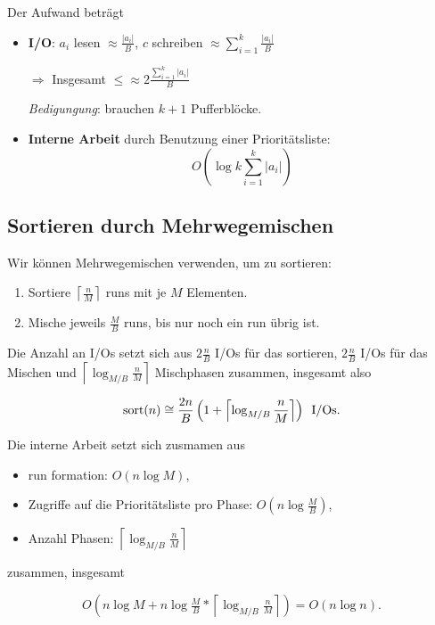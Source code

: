 Der Aufwand beträgt

\begin{itemize}
  \item \textbf{I/O}: \( a_i \) lesen \( \approx \frac{\left\vert a_i \right\vert}{B} \), \( c \) schreiben \( \approx \sum_{i=1}^k \frac{\left\vert a_i \right\vert}{B} \)

  \( \Rightarrow \) Insgesamt \( \leq \approx 2\frac{\sum_{i=1}^k \left\vert a_i \right\vert}{B} \)

  \emph{Bedigungung}: brauchen \( k+1 \) Pufferblöcke.

  \item \textbf{Interne Arbeit} durch Benutzung einer Prioritätsliste:
  \begin{equation*}
    O\left( \log k \sum_{i=1}^k \left\vert a_i \right\vert \right)
  \end{equation*}
\end{itemize}

\subsection{Sortieren durch Mehrwegemischen}

Wir können Mehrwegemischen verwenden, um zu sortieren:

\begin{enumerate}
  \item Sortiere \( \left\lceil \tfrac{n}{M} \right\rceil \) runs mit je \( M \) Elementen.
  \item Mische jeweils \( \tfrac{M}{B} \) runs, bis nur noch ein run übrig ist.
\end{enumerate}

Die Anzahl an I/Os setzt sich aus \( 2\tfrac{n}{B} \) I/Os für das sortieren, \( 2\tfrac{n}{B} \) I/Os für das Mischen und \( \left\lceil \log_{M/B} \tfrac{n}{M} \right\rceil \) Mischphasen zusammen, insgesamt also

\begin{equation*}
  \text{sort}(n) \cong \frac{2n}{B}\left( 1 + \left\lceil \log_{M/B} \frac{n}{M} \right\rceil \right) \enskip \text{I/Os.}
\end{equation*}

Die interne Arbeit setzt sich zusmamen aus
\begin{itemize}
  \item run formation: \( O(n\log M) \),
  \item Zugriffe auf die Prioritätsliste pro Phase: \( O\left( n\log \tfrac{M}{B} \right) \),
  \item Anzahl Phasen: \( \left\lceil \log_{M/B} \tfrac{n}{M} \right\rceil \)
\end{itemize}
zusammen, insgesamt

\begin{equation*}
  O\left( n \log M + n\log \tfrac{M}{B} * \left\lceil \log_{M/B} \tfrac{n}{M} \right\rceil \right) = O(n\log n)\text{.}
\end{equation*}